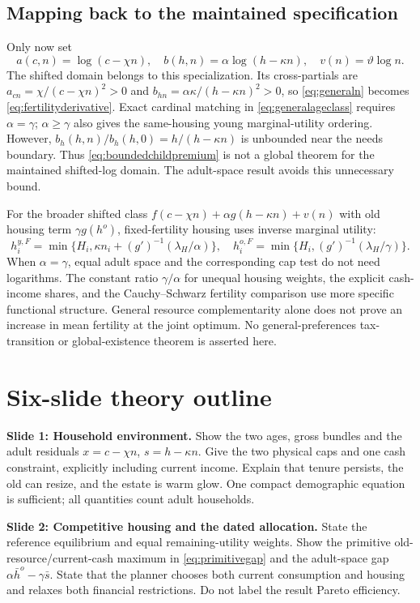 \documentclass[11pt]{article}
\newcommand{\tht}{\vartheta}
\begin{document}
\subsection{Mapping back to the maintained specification}
Only now set
\[
 a(c,n)=\log(c-\chi n),\quad
 b(h,n)=\alpha\log(h-\kappa n),\quad
 v(n)=\tht\log n.
\]
The shifted domain belongs to this specialization. Its cross-partials are
$a_{cn}=\chi/(c-\chi n)^2>0$ and
$b_{hn}=\alpha\kappa/(h-\kappa n)^2>0$, so \eqref{eq:generaln} becomes \eqref{eq:fertilityderivative}. Exact cardinal matching in \eqref{eq:generalageclass} requires $\alpha=\gamma$; $\alpha\ge\gamma$ also gives the same-housing young marginal-utility ordering. However,
$b_h(h,n)/b_h(h,0)=h/(h-\kappa n)$ is unbounded near the needs boundary. Thus \eqref{eq:boundedchildpremium} is not a global theorem for the maintained shifted-log domain. The adult-space result avoids this unnecessary bound.

For the broader shifted class $f(c-\chi n)+\alpha g(h-\kappa n)+v(n)$ with old housing term $\gamma g(h^o)$, fixed-fertility housing uses inverse marginal utility:
\[
 h_i^{y,F}=\min\{H_i,\kappa n_i+(g')^{-1}(\lambda_H/\alpha)\},\quad
 h_i^{o,F}=\min\{H_i,(g')^{-1}(\lambda_H/\gamma)\}.
\]
When $\alpha=\gamma$, equal adult space and the corresponding cap test do not need logarithms. The constant ratio $\gamma/\alpha$ for unequal housing weights, the explicit cash-income shares, and the Cauchy--Schwarz fertility comparison use more specific functional structure. General resource complementarity alone does not prove an increase in mean fertility at the joint optimum. No general-preferences tax-transition or global-existence theorem is asserted here.

\section{Six-slide theory outline}\label{app:slides}
\textbf{Slide 1: Household environment.} Show the two ages, gross bundles and the adult residuals $x=c-\chi n$, $s=h-\kappa n$. Give the two physical caps and one cash constraint, explicitly including current income. Explain that tenure persists, the old can resize, and the estate is warm glow. One compact demographic equation is sufficient; all quantities count adult households.

\textbf{Slide 2: Competitive housing and the dated allocation.} State the reference equilibrium and equal remaining-utility weights. Show the primitive old-resource/current-cash maximum in \eqref{eq:primitivegap} and the adult-space gap $\alpha\bar h^o-\gamma\bar s$. State that the planner chooses both current consumption and housing and relaxes both financial restrictions. Do not label the result Pareto efficiency.
\end{document}
